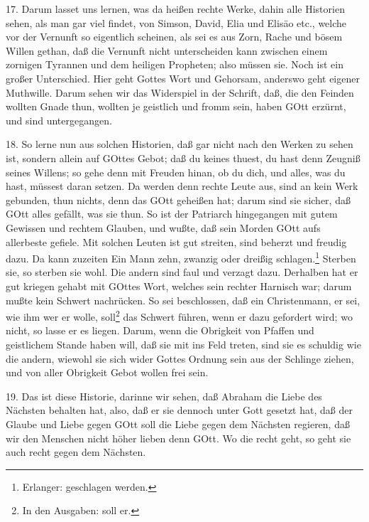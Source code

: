 17. Darum lasset uns lernen, was da heißen rechte Werke, dahin alle Historien sehen, als man gar viel findet, von Simson, David, Elia und Elisäo etc., welche vor der Vernunft so eigentlich scheinen, als sei es aus Zorn, Rache und bösem Willen gethan, daß die Vernunft nicht unterscheiden kann zwischen einem zornigen Tyrannen und dem heiligen Propheten; also müssen sie. Noch ist ein großer Unterschied. Hier geht
Gottes Wort und Gehorsam, anderswo geht eigener Muthwille. Darum sehen wir das Widerspiel in der Schrift, daß, die den Feinden wollten Gnade thun, wollten je geistlich und fromm sein, haben GOtt erzürnt, und sind untergegangen.

18. So lerne nun aus solchen Historien, daß gar nicht nach den Werken zu sehen ist, sondern allein auf GOttes Gebot; daß du keines thuest, du hast denn Zeugniß seines Willens; so gehe denn mit Freuden hinan, ob du dich, und alles, was du hast, müssest daran setzen. Da werden denn rechte Leute aus, sind an kein Werk gebunden, thun nichts, denn das GOtt geheißen hat; darum sind sie sicher, daß GOtt alles gefällt, was sie thun. So ist der Patriarch hingegangen mit gutem Gewissen und rechtem Glauben, und wußte, daß sein Morden GOtt aufs allerbeste gefiele. Mit solchen Leuten ist gut streiten, sind beherzt und freudig dazu. Da kann zuzeiten Ein Mann zehn, zwanzig oder dreißig schlagen.\footnote{Erlanger: geschlagen werden.} Sterben sie, so sterben sie wohl. Die andern sind faul und verzagt dazu. Derhalben hat er gut kriegen gehabt mit GOttes Wort, welches sein rechter Harnisch war; darum mußte kein Schwert nachrücken. So sei beschlossen, daß ein Christenmann, er sei, wie ihm wer er wolle, soll\footnote{In den Ausgaben: soll er.} das Schwert führen, wenn er dazu gefordert wird; wo nicht, so lasse er es liegen. Darum, wenn die Obrigkeit von Pfaffen und geistlichem Stande haben will, daß sie mit ins Feld treten, sind sie es schuldig wie die andern, wiewohl sie sich wider Gottes Ordnung sein aus der Schlinge ziehen, und von aller Obrigkeit Gebot wollen frei sein.

19. Das ist diese Historie, darinne wir sehen, daß Abraham die Liebe des Nächsten behalten hat, also, daß er sie dennoch unter Gott gesetzt hat, daß der Glaube und Liebe gegen GOtt soll die Liebe gegen dem Nächsten regieren, daß wir den Menschen nicht höher lieben denn GOtt. Wo die recht geht, so geht sie auch recht gegen dem Nächsten.

